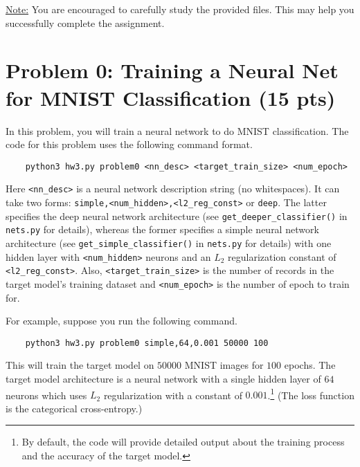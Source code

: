 \medskip

\noindent
\underline{Note:} You are encouraged to carefully study the provided files. This may help you successfully complete the assignment.


\newpage
\section*{Problem 0: Training a Neural Net for MNIST Classification (15 pts)}
%

In this problem, you will train a neural network to do MNIST classification. 
The code for this problem uses the following command format.
%
\begin{Verbatim}
	python3 hw3.py problem0 <nn_desc> <target_train_size> <num_epoch>
\end{Verbatim}
%

Here \texttt{<nn\_desc>} is a neural network description string (no whitespaces). It can take two forms: \texttt{simple,<num\_hidden>,<l2\_reg\_const>} or \texttt{deep}. The latter specifies the deep neural network architecture (see \texttt{get\_deeper\_classifier()} in \texttt{nets.py} for details), whereas the former specifies a simple neural network architecture (see \texttt{get\_simple\_classifier()} in \texttt{nets.py} for details) with one hidden layer with \texttt{<num\_hidden>} neurons and an $L_2$ regularization constant of \texttt{<l2\_reg\_const>}. Also, \texttt{<target\_train\_size>} is the number of records in the target model's training dataset and \texttt{<num\_epoch>} is the number of epoch to train for.




For example, suppose you run the following command.
%
\begin{Verbatim}
	python3 hw3.py problem0 simple,64,0.001 50000 100
\end{Verbatim}
This will train the target model on $50000$ MNIST images for $100$ epochs. The target model architecture is a neural network with a single hidden layer of $64$ neurons which uses $L_2$ regularization with a constant of $0.001$.\footnote{By default, the code will provide detailed output about the training process and the accuracy of the target model.} (The loss function is the categorical cross-entropy.)



